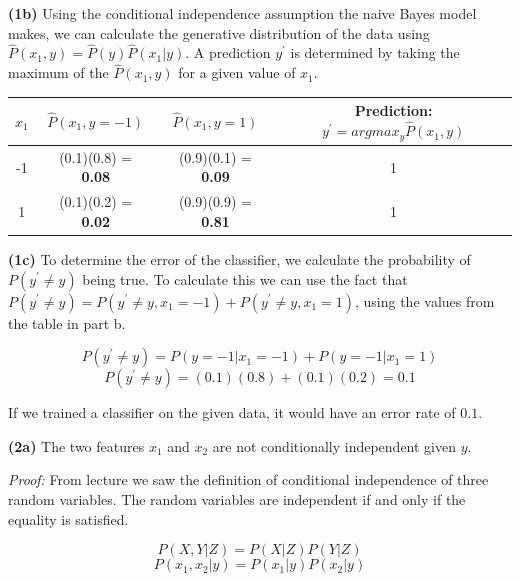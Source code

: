 \documentclass[11pt]{article}
\renewcommand\part[1]{\vspace{.10in}\textbf{(#1)}}
\begin{document}
\part{1b} Using the conditional independence assumption the naive Bayes model makes, we can calculate the generative distribution of the data using $\hat P(x_1, y) = \hat P(y) \hat P(x_1 | y)$. A prediction $y^\prime$ is determined by taking the maximum of the $\hat P(x_1, y)$ for a given value of $x_1$.

\begin{table}[H]
\centering
{\renewcommand{\arraystretch}{1.2}%
\begin{tabular}{| c | c | c | c |}
\hline
$x_1$ & $\hat P(x_1, y = -1)$ & $\hat P(x_1, y = 1)$ & \textbf{Prediction:} $y^\prime = argmax_y \hat P(x_1, y)$\\
\hline
-1 & (0.1)(0.8) = \textbf{0.08} & (0.9)(0.1) = \textbf{0.09} & 1\\ \hline
1 & (0.1)(0.2) = \textbf{0.02} & (0.9)(0.9) = \textbf{0.81} & 1\\ \hline
\end{tabular}}
\end{table}

\part{1c} To determine the error of the classifier, we calculate the probability of $P(y^\prime \neq y)$ being true. To calculate this we can use the fact that $P(y^\prime \neq y) = P(y^\prime \neq y, x_1 = -1) + P(y^\prime \neq y, x_1 = 1)$, using the values from the table in part b.

$$P(y^\prime \neq y) = P(y = -1 | x_1 = -1) + P(y = -1 | x_1 = 1)$$
$$P(y^\prime \neq y) = (0.1)(0.8) + (0.1)(0.2) = 0.1$$

If we trained a classifier on the given data, it would have an error rate of $\mathbf{0.1}$.

\part{2a} The two features $x_1$ and $x_2$ are not conditionally independent given $y$.

\textit{Proof:} From lecture we saw the definition of conditional independence of three random variables. The random variables are independent if and only if the equality is satisfied.

$$P(X, Y|Z) = P(X|Z)P(Y|Z)$$
$$P(x_1, x_2|y) = P(x_1|y)P(x_2|y)$$
\end{document}
